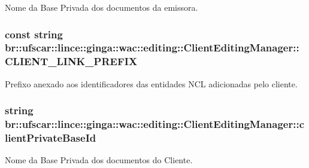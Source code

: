 Nome da Base Privada dos documentos da emissora. 

\hypertarget{classbr_1_1ufscar_1_1lince_1_1ginga_1_1wac_1_1editing_1_1ClientEditingManager_ad67459adf66064e713ba4fbf1870ce26}{
\subsubsection[{CLIENT\_\-LINK\_\-PREFIX}]{\setlength{\rightskip}{0pt plus 5cm}const string {\bf br::ufscar::lince::ginga::wac::editing::ClientEditingManager::CLIENT\_\-LINK\_\-PREFIX}}}
\label{classbr_1_1ufscar_1_1lince_1_1ginga_1_1wac_1_1editing_1_1ClientEditingManager_ad67459adf66064e713ba4fbf1870ce26}


Prefixo anexado aos identificadores das entidades NCL adicionadas pelo cliente. 

\hypertarget{classbr_1_1ufscar_1_1lince_1_1ginga_1_1wac_1_1editing_1_1ClientEditingManager_a7610c9f79a41fb3cd819cffdd8c3d576}{
\subsubsection[{clientPrivateBaseId}]{\setlength{\rightskip}{0pt plus 5cm}string {\bf br::ufscar::lince::ginga::wac::editing::ClientEditingManager::clientPrivateBaseId}}}
\label{classbr_1_1ufscar_1_1lince_1_1ginga_1_1wac_1_1editing_1_1ClientEditingManager_a7610c9f79a41fb3cd819cffdd8c3d576}


Nome da Base Privada dos documentos do Cliente. 


